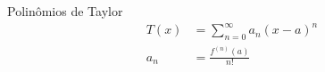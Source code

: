 \documentclass[border=2pt]{standalone}
\begin{document}
\begin{varwidth}{\linewidth}
Polinômios de Taylor
\begin{align*}
T(x)    &= \sum_{n=0}^\infty {a}_{n}{(x-a)}^{n} \\
{a}_{n} &= \frac{{f}^{(n)}(a)}{n!}
\end{align*}
\end{varwidth}
\end{document}
